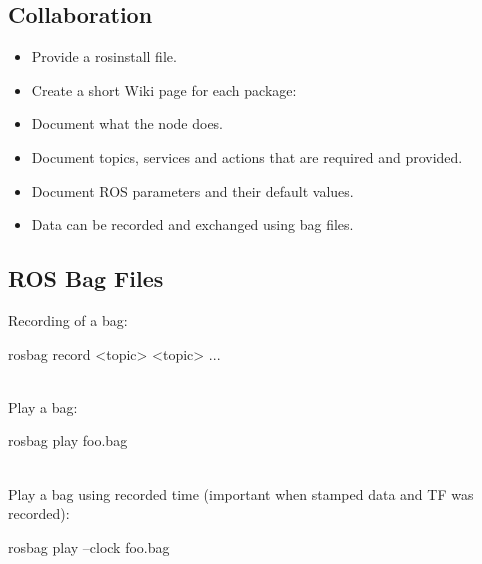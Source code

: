 \subsection{Collaboration}
\begin{itemize}
\item Provide a rosinstall file.
\item Create a short Wiki page for each package:
\item Document what the node does.
\item Document topics, services and actions that are required and
provided.
\item Document ROS parameters and their default values.
\item Data can be recorded and exchanged using bag files.
\end{itemize}

\subsection{ROS Bag Files}
Recording of a bag:
\begin{tt}rosbag record <topic> <topic> ...\end{tt}\\
Play a bag:
\begin{tt}rosbag play foo.bag\end{tt}\\
Play a bag using recorded time (important when stamped data and
TF was recorded):\\
\begin{tt}rosbag play --clock foo.bag\end{tt}

